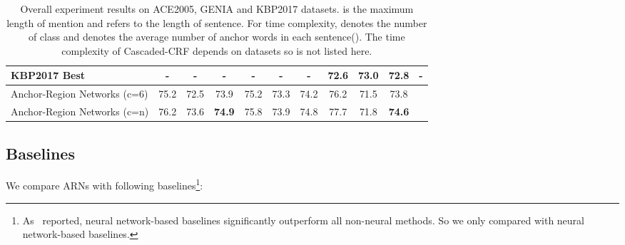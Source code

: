 \documentclass[11pt,a4paper]{article}
\begin{document}
\begin{table*}[!ht]
\begin{center}
{\begin{tabular}{l||c|c|c||c|c|c||c|c|c||c}
  KBP2017 Best~\cite{ji2017overview}      & -             & -         & -     & -            & -         & -     & 72.6           & 73.0       & 72.8   & -  \\  \hline\hline

  Anchor-Region Networks (c=6)            & 75.2          & 72.5      & 73.9  & 75.2         & 73.3      & 74.2  & 76.2           & 71.5       & 73.8   &    \\
  Anchor-Region Networks (c=n)            & 76.2          & 73.6      & \textbf{74.9}  & 75.8         & 73.9      & 74.8  & 77.7           & 71.8       & \textbf{74.6} &    \\ \hline
\end{tabular}
}
\end{center}
\caption{Overall experiment results on ACE2005, GENIA and KBP2017 datasets.  is the maximum length of mention and  refers to the length of sentence. For time complexity,  denotes the number of class and  denotes the average number of anchor words in each sentence(). The time complexity of Cascaded-CRF depends on datasets so is not listed here.}
\label{tab:overall_rst}
\end{table*}


\subsection{Baselines}
We compare ARNs with following baselines\footnote{As~\citet{D18-1019} reported, neural network-based baselines significantly outperform all non-neural methods. So we only compared with neural network-based baselines.}:
\end{document}
